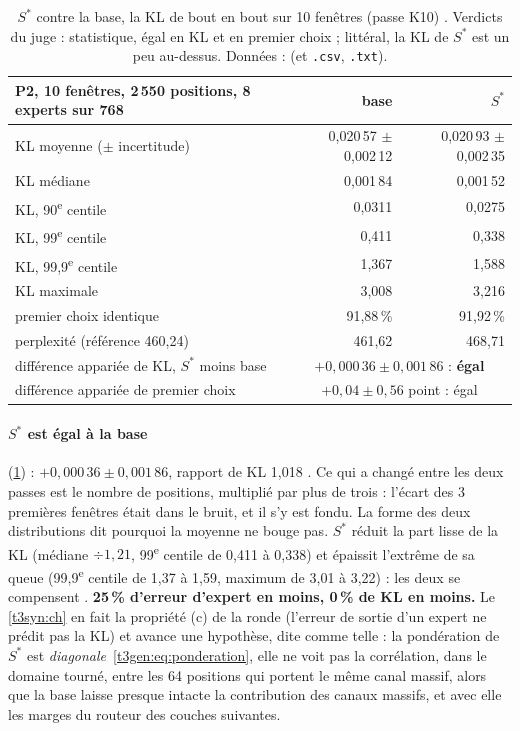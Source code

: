 \begin{table}[tbp]
\centering\small
\begin{tabular}{l r r}
\toprule
P2, 10 fenêtres, 2\,550 positions, 8 experts sur 768 & base & $S^{*}$ \\
\midrule
KL moyenne ($\pm$ incertitude) & 0,020\,57 $\pm$ 0,002\,12 & 0,020\,93 $\pm$ 0,002\,35 \\
KL médiane & 0,001\,84 & 0,001\,52 \\
KL, 90\textsuperscript{e} centile & 0,0311 & 0,0275 \\
KL, 99\textsuperscript{e} centile & 0,411 & 0,338 \\
KL, 99,9\textsuperscript{e} centile & 1,367 & 1,588 \\
KL maximale & 3,008 & 3,216 \\
premier choix identique & 91,88\,\% & 91,92\,\% \\
perplexité (référence 460,24) & 461,62 & 468,71 \\
\midrule
différence appariée de KL, $S^{*}$ moins base & \multicolumn{2}{c}{$+0{,}000\,36 \pm 0{,}001\,86$ : \textbf{égal}} \\
différence appariée de premier choix & \multicolumn{2}{c}{$+0{,}04 \pm 0{,}56$ point : égal} \\
\bottomrule
\end{tabular}
\caption[$S^{*}$ contre la base, la KL sur dix fenêtres]{$S^{*}$ contre la base, la KL de bout en bout sur 10 fenêtres (passe K10) \mes. Verdicts du juge : statistique, égal en KL et en premier choix ; littéral, la KL de $S^{*}$ est un peu au-dessus. Données :  (et \texttt{.csv}, \texttt{.txt}).}
\label{t3gen:tab:k10}
\end{table}

\paragraph{$S^{*}$ est égal à la base} (\cref{t3gen:tab:k10}) : $+0{,}000\,36 \pm 0{,}001\,86$, rapport de KL 1,018 \calc. Ce qui a changé entre les deux passes est le nombre de positions, multiplié par plus de trois : l'écart des 3 premières fenêtres était dans le bruit, et il s'y est fondu. La forme des deux distributions dit pourquoi la moyenne ne bouge pas. $S^{*}$ réduit la part lisse de la KL (médiane $\div 1{,}21$, 99\textsuperscript{e} centile de 0,411 à 0,338) et épaissit l'extrême de sa queue (99,9\textsuperscript{e} centile de 1,37 à 1,59, maximum de 3,01 à 3,22) : les deux se compensent \mes. \textbf{25\,\% d'erreur d'expert en moins, 0\,\% de KL en moins.} Le \cref{t3syn:ch} en fait la propriété (c) de la ronde (l'erreur de sortie d'un expert ne prédit pas la KL) et avance une hypothèse, dite comme telle : la pondération de $S^{*}$ est \emph{diagonale}~\eqref{t3gen:eq:ponderation}, elle ne voit pas la corrélation, dans le domaine tourné, entre les 64 positions qui portent le même canal massif, alors que la base laisse presque intacte la contribution des canaux massifs, et avec elle les marges du routeur des couches suivantes.

